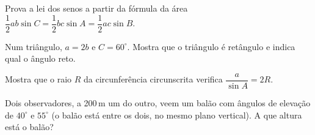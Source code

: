 \documentclass[12pt]{article}
\begin{document}
\begin{exercicios}
  \item Prova a lei dos senos a partir da fórmula da área $\dfrac{1}{2}ab\sin C = \dfrac{1}{2}bc\sin A = \dfrac{1}{2}ac\sin B$.
  \item Num triângulo, $a = 2b$ e $C = 60^\circ$. Mostra que o triângulo é retângulo e indica qual o ângulo reto.
  \item Mostra que o raio $R$ da circunferência circunscrita verifica $\dfrac{a}{\sin A} = 2R$.
  \item Dois observadores, a 200\,m um do outro, veem um balão com ângulos de elevação de $40^\circ$ e $55^\circ$ (o balão está entre os dois, no mesmo plano vertical). A que altura está o balão?
\end{exercicios}
\end{document}
